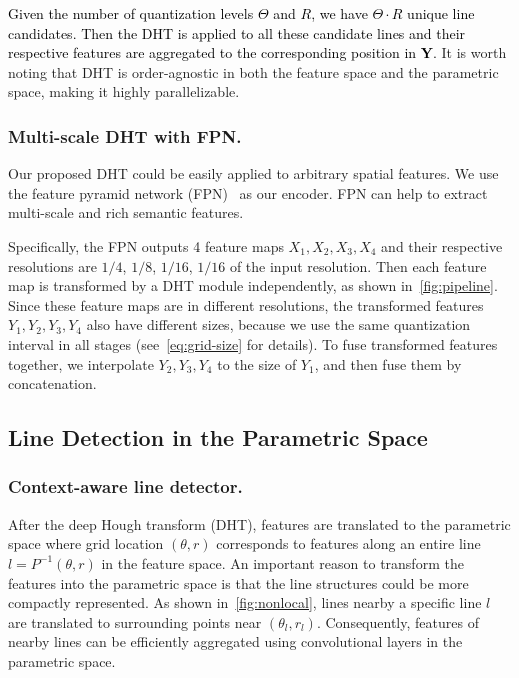 \documentclass[10pt,journal,cspaper,compsoc]{IEEEtran}
\newcommand{\revise}[1]{{\textcolor{black}{#1}}}
\begin{document}
\revise{Given the number of quantization levels $\Theta$ and $R$,
we have $\Theta\cdot R$ unique line candidates.
%
Then the DHT is applied to all these candidate lines and their respective features
are aggregated to the corresponding position in $\mathbf{Y}$.}
%
%
It is worth noting that DHT is order-agnostic in both the feature space and the parametric space,
making it highly parallelizable.


\subsubsection{Multi-scale DHT with FPN.}\label{sec:ms-dht-fpn}
Our proposed DHT could be easily applied to arbitrary spatial features.
% 
We use the feature pyramid network (FPN)~\cite{lin2017feature} as our encoder.
%
FPN can help to extract multi-scale and rich semantic features.


Specifically, the FPN outputs 4 feature maps $X_1, X_2, X_3, X_4$ and their respective
resolutions are $1/4$, $1/8$, $1/16$, $1/16$ of the input resolution.
%
Then each feature map is transformed by a DHT module independently, as shown in~\cref{fig:pipeline}.
%
Since these feature maps are in different resolutions, the transformed features
$Y_1, Y_2, Y_3, Y_4$ also have different sizes, because we use the same quantization
interval in all stages (see~\cref{eq:grid-size} for details).
%
To fuse transformed features together, we interpolate $Y_2, Y_3, Y_4$
to the size of $Y_1$, and then fuse them by concatenation.

\subsection{Line Detection in the Parametric Space}


\subsubsection{Context-aware line detector.}\label{sec:ctx-line-detector}
After the deep Hough transform (DHT), features are translated to the parametric space
where grid location $(\theta, r)$ corresponds to
features along an entire line $l=P^{-1}(\theta, r)$ in the feature space.
%
An important reason to transform the features into the parametric space 
is that the line structures could
be more compactly represented.
%
As shown in~\cref{fig:nonlocal},
lines nearby a specific line $l$ are translated to
surrounding points near $(\theta_l, r_l)$.
%
Consequently, features of nearby lines can be efficiently aggregated
using convolutional layers in the parametric space.
\end{document}
